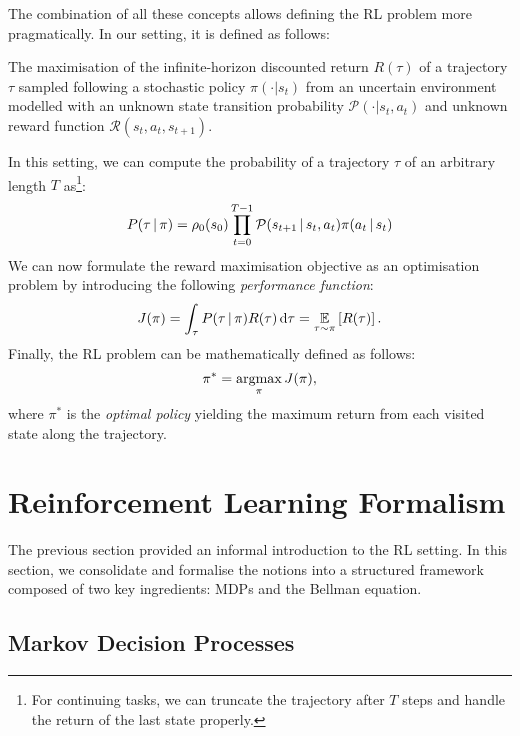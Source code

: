 The combination of all these concepts allows defining the \ac{RL} problem more pragmatically.
In our setting, it is defined as follows:
%
\begin{displayquote}
    The maximisation of the infinite-horizon discounted return $R(\tau)$ of a trajectory $\tau$ sampled following a stochastic policy $\pi(\cdot|s_t)$ from an uncertain environment modelled with an unknown state transition probability $\mathcal{P}(\cdot|s_t, a_t)$ and unknown reward function $\mathcal{R}(s_t, a_t, s_{t+1})$.
\end{displayquote}
%
In this setting, we can compute the probability of a trajectory $\tau$ of an arbitrary length $T$ as\footnote{For continuing tasks, we can truncate the trajectory after $T$ steps and handle the return of the last state properly.}:
%
\begin{equation}
    \label{equation:probability_of_trajectory}
    P(\tau \operatorname{\mid} \pi) = \rho_0(s_0) \prod_{t=0}^{T-1} \mathcal{P}(s_{t+1} \operatorname{\mid} s_t, a_t) \pi(a_t \operatorname{\mid} s_t)
\end{equation}
%
We can now formulate the reward maximisation objective as an optimisation problem by introducing the following \emph{performance function}:
%
\begin{equation}
    \label{equation:policy_performance_function}
    J(\pi)
    = \int_\tau P(\tau \operatorname{\mid} \pi) R(\tau) \dd{\tau}
    = \operatorname*{\mathbb{E}}_{\tau \sim \pi} \left[ R(\tau) \right] .
\end{equation}
%
Finally, the \ac{RL} problem can be mathematically defined as follows:
%
\begin{equation*}
    \pi^* = \operatorname*{argmax}_{\pi} J(\pi) ,
\end{equation*}
%
where $\pi^*$ is the \emph{optimal policy} yielding the maximum return from each visited state along the trajectory.

\section{Reinforcement Learning Formalism}

The previous section provided an informal introduction to the \acl{RL} setting.
In this section, we consolidate and formalise the notions into a structured framework composed of two key ingredients: \aclp{MDP} and the Bellman equation.

\subsection{Markov Decision Processes}

